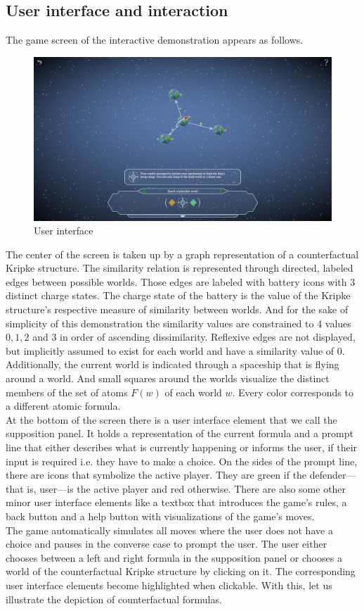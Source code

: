 \documentclass[a4paper,american,10pt]{paper}
\theoremstyle{definition}\newtheorem{lemma}[thm]{Lemma}
\theoremstyle{definition}\newtheorem{proposition}[thm]{Proposition}
\theoremstyle{definition}\newtheorem{corollary}[thm]{Corollary}
\theoremstyle{definition}\newtheorem{definition}{Definition}
\begin{document}
\subsection{User interface and interaction}\label{sec:interface}
The game screen of the interactive demonstration appears as follows.
\begin{figure}[H]
\centering
\includegraphics[width=\textwidth]{UI_Layout}
\caption{User interface}
\end{figure}
The center of the screen is taken up by a graph representation of a counterfactual Kripke structure. The similarity relation is represented through directed, labeled edges between possible worlds. Those edges are labeled with battery icons with 3 distinct charge states. The charge state of the battery is the value of the Kripke structure's respective measure of similarity between worlds. And for the sake of simplicity of this demonstration the similarity values are constrained to 4 values $0,1,2$ and $3$ in order of ascending dissimilarity. Reflexive edges are not displayed, but implicitly assumed to exist for each world and have a similarity value of 0. Additionally, the current world is indicated through a spaceship that is flying around a world. And small squares around the worlds visualize the distinct members of the set of atoms $F(w)$ of each world $w$. Every color corresponds to a different atomic formula.\\
\indent At the bottom of the screen there is a user interface element that we call the supposition panel. It holds a representation of the current formula and a prompt line that either describes what is currently happening or informs the user, if their input is required i.e. they have to make a choice. On the sides of the prompt line, there are icons that symbolize the active player. They are green if the defender---that is, user---is the active player and red otherwise.
There are also some other minor user interface elements like a textbox that introduces the game's rules, a back button and a help button with visualizations of the game's moves.\\
\indent The game automatically simulates all moves where the user does not have a choice and pauses in the converse case to prompt the user. The user either chooses between a left and right formula in the supposition panel or chooses a world of the counterfactual Kripke structure by clicking on it. The corresponding user interface elements become highlighted when clickable. With this, let us illustrate the depiction of counterfactual formulas.
\end{document}
